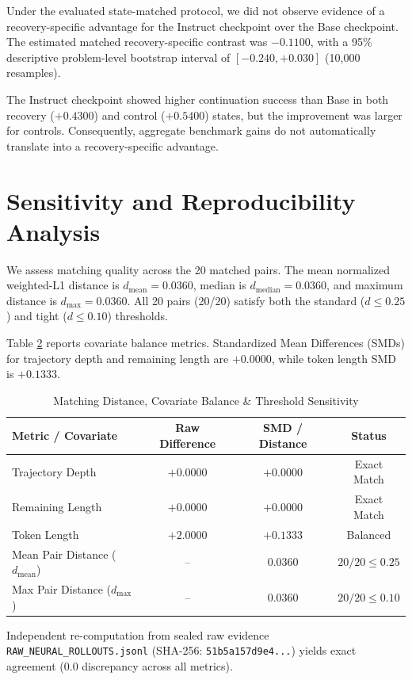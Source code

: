\documentclass[10pt,conference,letterpaper]{IEEEtran}
\begin{document}
\begin{table}[htbp]
Under the evaluated state-matched protocol, we did not observe evidence of a recovery-specific advantage for the Instruct checkpoint over the Base checkpoint. The estimated matched recovery-specific contrast was $-0.1100$, with a 95\% descriptive problem-level bootstrap interval of $[-0.240, +0.030]$ (10,000 resamples).

The Instruct checkpoint showed higher continuation success than Base in both recovery ($+0.4300$) and control ($+0.5400$) states, but the improvement was larger for controls. Consequently, aggregate benchmark gains do not automatically translate into a recovery-specific advantage.

\section{Sensitivity and Reproducibility Analysis}
We assess matching quality across the 20 matched pairs. The mean normalized weighted-L1 distance is $d_{\text{mean}} = 0.0360$, median is $d_{\text{median}} = 0.0360$, and maximum distance is $d_{\max} = 0.0360$. All 20 pairs (20/20) satisfy both the standard ($d \le 0.25$) and tight ($d \le 0.10$) thresholds.

Table \ref{tab:sensitivity} reports covariate balance metrics. Standardized Mean Differences (SMDs) for trajectory depth and remaining length are $+0.0000$, while token length SMD is $+0.1333$.

\begin{table}[htbp]
\caption{Matching Distance, Covariate Balance & Threshold Sensitivity}
\label{tab:sensitivity}
\centering
\begin{tabular}{lccc}
\toprule
\textbf{Metric / Covariate} & \textbf{Raw Difference} & \textbf{SMD / Distance} & \textbf{Status} \\
\midrule
Trajectory Depth & $+0.0000$ & $+0.0000$ & Exact Match \\
Remaining Length & $+0.0000$ & $+0.0000$ & Exact Match \\
Token Length & $+2.0000$ & $+0.1333$ & Balanced \\
\midrule
Mean Pair Distance ($d_{\text{mean}}$) & -- & $0.0360$ & $20/20 \le 0.25$ \\
Max Pair Distance ($d_{\max}$) & -- & $0.0360$ & $20/20 \le 0.10$ \\
\bottomrule
\end{tabular}
\end{table}

Independent re-computation from sealed raw evidence \texttt{RAW\_NEURAL\_ROLLOUTS.jsonl} (SHA-256: \texttt{51b5a157d9e4...}) yields exact agreement ($0.0$ discrepancy across all metrics).


\end{table}
\end{document}

